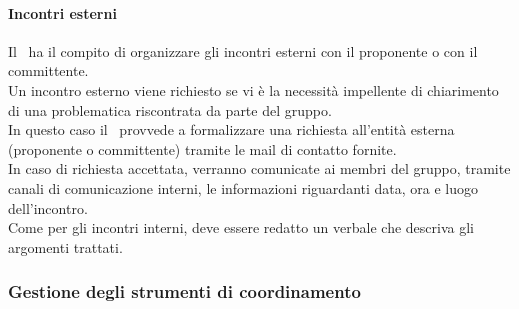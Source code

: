       \paragraph{Incontri esterni}
        Il \roleProjectManager\ ha il compito di organizzare gli incontri esterni con il proponente o con il committente.\\
        Un incontro esterno viene richiesto se vi è la necessità impellente di chiarimento di una problematica riscontrata da parte del gruppo.\\
        In questo caso il \roleProjectManager\ provvede a formalizzare una richiesta all’entità esterna (proponente o committente) tramite le mail di contatto fornite.\\
        In caso di richiesta accettata, verranno comunicate ai membri del gruppo, tramite canali di comunicazione interni, le informazioni riguardanti data, ora e luogo dell’incontro.\\
        Come per gli incontri interni, deve essere redatto un verbale che descriva gli argomenti trattati.

    \subsubsection{Gestione degli strumenti di coordinamento}
